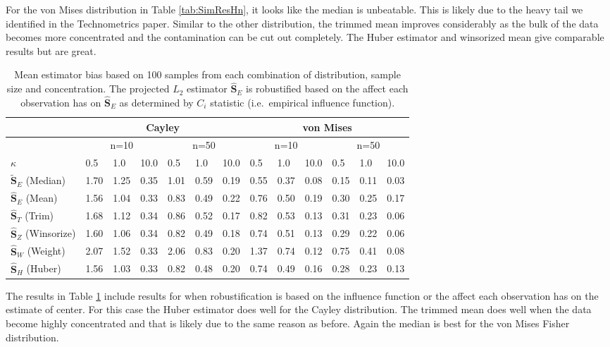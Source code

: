 \documentclass{article}\usepackage{graphicx, color}
\newcommand{\ProjMean}{{\widehat{\bm S}_{E}}}
\newcommand{\ProjMedian}{{\widetilde{\bm S}_{E}}}
\newcommand{\HuberMean}{{\widehat{\bm S}_H}}
\newcommand{\WeightMean}{{\widehat{\bm S}_W}}
\newcommand{\TrimMean}{{\widehat{\bm S}_T}}
\newcommand{\WinzMean}{{\widehat{\bm S}_Z}}
\newcommand{\red}[1]{{\color{red} #1}}
\begin{document}
For the von Mises distribution in Table \ref{tab:SimResHn}, it looks like the median is unbeatable.  This is likely due to the heavy tail we identified in the Technometrics paper.  Similar to the other distribution, the trimmed mean improves considerably as the bulk of the data becomes more concentrated and the contamination can be cut out completely.  The Huber estimator and winsorized mean give comparable results but are great.

\begin{table}[ht]
\centering
\begin{tabular}{l|lll|lll|lll|lll}
  \hline
 & \multicolumn{6}{|c|}{Cayley} & \multicolumn{6}{|c}{von Mises}   \\ 
\hline
   &  \multicolumn{3}{|c|}{n=10} & \multicolumn{3}{|c|}{n=50} & \multicolumn{3}{|c|}{n=10} & \multicolumn{3}{|c}{n=50} \\
  $\kappa$ &  0.5 &  1.0 & 10.0 &  0.5 &  1.0 & 10.0 &  0.5 &  1.0 & 10.0 &  0.5 &  1.0 & 10.0 \\ \hline
  $\ProjMedian$ (Median) & 1.70 & 1.25 & 0.35 & 1.01 & 0.59 & 0.19 & \red{ 0.55} & \red{ 0.37}& \red{ 0.08} & \red{ 0.15} & \red{ 0.11} & \red{ 0.03} \\ 
  $\ProjMean$ (Mean) & \red{ 1.56} & 1.04 & \red{ 0.33} & 0.83 & 0.49 & 0.22 & 0.76 & 0.50 & 0.19 & 0.30 & 0.25 & 0.17 \\ 
   $\TrimMean$ (Trim) & 1.68 & 1.12 & 0.34 & 0.86 & 0.52 & \red{ 0.17} & 0.82 & 0.53 & 0.13 & 0.31 & 0.23 & 0.06 \\ 
  $\WinzMean$ (Winsorize) & 1.60 & 1.06 & 0.34 & \red{ 0.82} & 0.49 & 0.18 & 0.74 & 0.51 & 0.13 & 0.29 & 0.22 & 0.06 \\ 
  $\WeightMean$ (Weight) & 2.07 & 1.52 & \red{ 0.33} & 2.06 & 0.83 & 0.20 & 1.37 & 0.74 & 0.12 & 0.75 & 0.41 & 0.08 \\ 
  $\HuberMean$ (Huber) & \red{ 1.56 }& \red{ 1.03} & \red{ 0.33} & \red{ 0.82} & \red{ 0.48} & 0.20 & 0.74 & 0.49 & 0.16 & 0.28 & 0.23 & 0.13 \\ 
   \hline
\end{tabular}
\caption{Mean estimator bias based on 100 samples from each combination of distribution, sample size and concentration.  The projected $L_2$ estimator $\ProjMean$ is robustified based on the affect each observation has on $\ProjMean$ as determined by $C_i$ statistic (i.e.~empirical influence function).}
\label{tab:SimResC}
\end{table}

The results in Table \ref{tab:SimResC} include results for when robustification is based on the influence function or the affect each observation has on the estimate of center.  For this case the Huber estimator does well for the Cayley distribution.  The trimmed mean does well when the data become highly concentrated and that is likely due to the same reason as before.  Again the median is best for the von Mises Fisher distribution.  
\end{document}
